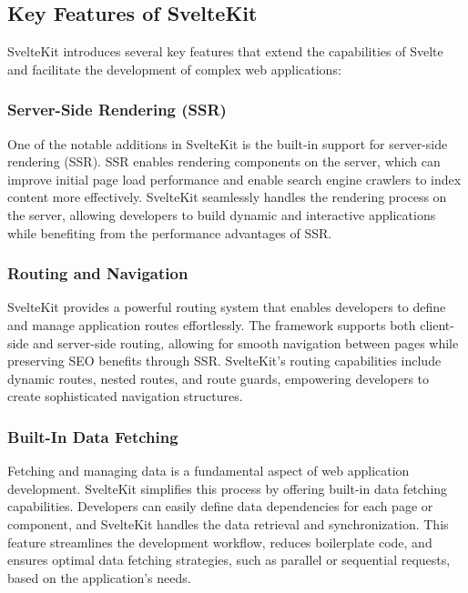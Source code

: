 \subsection{Key Features of SvelteKit}

SvelteKit introduces several key features that extend the capabilities of Svelte and facilitate the development of complex web applications:

\subsubsection{Server-Side Rendering (SSR)}

One of the notable additions in SvelteKit is the built-in support for server-side rendering (SSR). SSR enables rendering components on the server, which can improve initial page load performance and enable search engine crawlers to index content more effectively. SvelteKit seamlessly handles the rendering process on the server, allowing developers to build dynamic and interactive applications while benefiting from the performance advantages of SSR.

\subsubsection{Routing and Navigation}

SvelteKit provides a powerful routing system that enables developers to define and manage application routes effortlessly. The framework supports both client-side and server-side routing, allowing for smooth navigation between pages while preserving SEO benefits through SSR. SvelteKit's routing capabilities include dynamic routes, nested routes, and route guards, empowering developers to create sophisticated navigation structures.

\subsubsection{Built-In Data Fetching}

Fetching and managing data is a fundamental aspect of web application development. SvelteKit simplifies this process by offering built-in data fetching capabilities. Developers can easily define data dependencies for each page or component, and SvelteKit handles the data retrieval and synchronization. This feature streamlines the development workflow, reduces boilerplate code, and ensures optimal data fetching strategies, such as parallel or sequential requests, based on the application's needs.

